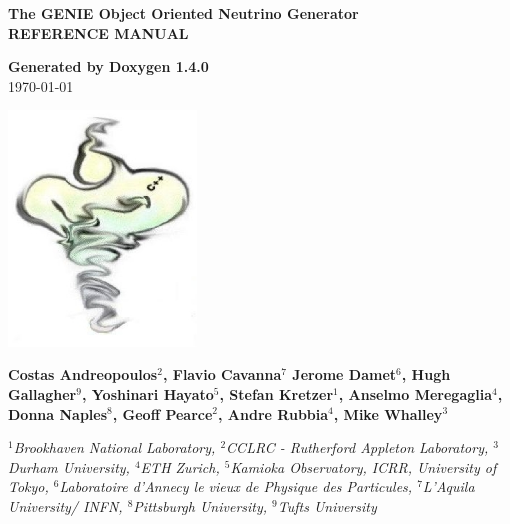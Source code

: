 \documentclass[a4paper]{book}
\begin{document}
\begin{titlepage}
\vspace*{3cm}
\begin{center}

{\Large \textbf{The GENIE Object Oriented Neutrino Generator}}\\
\vspace*{1cm}
{\Large \textbf{REFERENCE MANUAL}}\\
\vspace*{1cm}

{\large \textbf{Generated by Doxygen 1.4.0}}\\
\vspace*{0.5cm}
{\large \today}\\
\vspace*{1cm}

\includegraphics[width=5cm,keepaspectratio]{../../data/logo/genie_logo.eps}

\vspace*{0.6cm}

{\textbf{Costas Andreopoulos$^{2}$, Flavio Cavanna$^{7}$ Jerome Damet$^{6}$, Hugh Gallagher$^{9}$,
Yoshinari Hayato$^{5}$, Stefan Kretzer$^{1}$, Anselmo Meregaglia$^{4}$,
Donna Naples$^{8}$, Geoff Pearce$^{2}$, Andre Rubbia$^{4}$, Mike Whalley$^{3}$}}\\
\vspace*{0.5cm}

{\textit{$^{1}$Brookhaven National Laboratory, $^{2}$CCLRC - Rutherford Appleton Laboratory,
$^{3}$Durham University, $^{4}$ETH Zurich, $^{5}$Kamioka Observatory, ICRR, University of Tokyo, 
$^{6}$Laboratoire d'Annecy le vieux de Physique des Particules, $^{7}$L'Aquila University/ INFN, 
$^{8}$Pittsburgh University, $^{9}$Tufts University}}

\end{center}
\end{titlepage}
\clearemptydoublepage
{}
\tableofcontents
\clearemptydoublepage
{}
\end{document}

